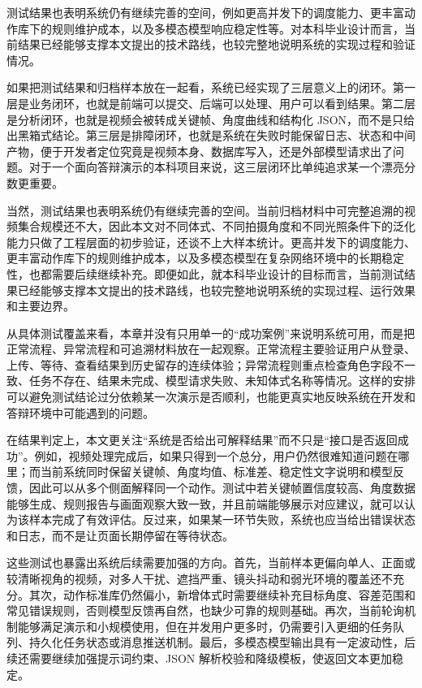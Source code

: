 测试结果也表明系统仍有继续完善的空间，例如更高并发下的调度能力、更丰富动作库下的规则维护成本，以及多模态模型响应稳定性等。对本科毕业设计而言，当前结果已经能够支撑本文提出的技术路线，也较完整地说明系统的实现过程和验证情况。

如果把测试结果和归档样本放在一起看，系统已经实现了三层意义上的闭环。第一层是业务闭环，也就是前端可以提交、后端可以处理、用户可以看到结果。第二层是分析闭环，也就是视频会被转成关键帧、角度曲线和结构化 JSON，而不是只给出黑箱式结论。第三层是排障闭环，也就是系统在失败时能保留日志、状态和中间产物，便于开发者定位究竟是视频本身、数据库写入，还是外部模型请求出了问题。对于一个面向答辩演示的本科项目来说，这三层闭环比单纯追求某一个漂亮分数更重要。

当然，测试结果也表明系统仍有继续完善的空间。当前归档材料中可完整追溯的视频集合规模还不大，因此本文对不同体式、不同拍摄角度和不同光照条件下的泛化能力只做了工程层面的初步验证，还谈不上大样本统计。更高并发下的调度能力、更丰富动作库下的规则维护成本，以及多模态模型在复杂网络环境中的长期稳定性，也都需要后续继续补充。即便如此，就本科毕业设计的目标而言，当前测试结果已经能够支撑本文提出的技术路线，也较完整地说明系统的实现过程、运行效果和主要边界。

从具体测试覆盖来看，本章并没有只用单一的“成功案例”来说明系统可用，而是把正常流程、异常流程和可追溯材料放在一起观察。正常流程主要验证用户从登录、上传、等待、查看结果到历史留存的连续体验；异常流程则重点检查角色字段不一致、任务不存在、结果未完成、模型请求失败、未知体式名称等情况。这样的安排可以避免测试结论过分依赖某一次演示是否顺利，也能更真实地反映系统在开发和答辩环境中可能遇到的问题。

在结果判定上，本文更关注“系统是否给出可解释结果”而不只是“接口是否返回成功”。例如，视频处理完成后，如果只得到一个总分，用户仍然很难知道问题在哪里；而当前系统同时保留关键帧、角度均值、标准差、稳定性文字说明和模型反馈，因此可以从多个侧面解释同一个动作。测试中若关键帧置信度较高、角度数据能够生成、规则报告与画面观察大致一致，并且前端能够展示对应建议，就可以认为该样本完成了有效评估。反过来，如果某一环节失败，系统也应当给出错误状态和日志，而不是让页面长期停留在等待状态。

这些测试也暴露出系统后续需要加强的方向。首先，当前样本更偏向单人、正面或较清晰视角的视频，对多人干扰、遮挡严重、镜头抖动和弱光环境的覆盖还不充分。其次，动作标准库仍然偏小，新增体式时需要继续补充目标角度、容差范围和常见错误规则，否则模型反馈再自然，也缺少可靠的规则基础。再次，当前轮询机制能够满足演示和小规模使用，但在并发用户更多时，仍需要引入更细的任务队列、持久化任务状态或消息推送机制。最后，多模态模型输出具有一定波动性，后续还需要继续加强提示词约束、JSON 解析校验和降级模板，使返回文本更加稳定。

